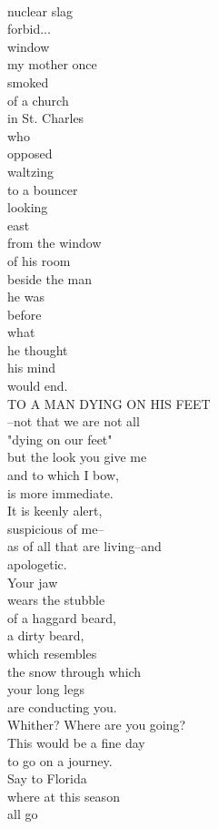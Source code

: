 \documentclass[smalldemyvopaper,11pt,twoside,onecolumn,openright,extrafontsizes]{memoir}
\begin{document}
\\nuclear slag
\\forbid...
\\window
\\my mother once
\\smoked
\\of a church
\\in St. Charles
\\who
\\opposed
\\waltzing
\\to a bouncer
\\looking
\\east
\\from the window
\\of his room
\\beside the man
\\he was
\\before
\\what
\\he thought
\\his mind
\\would end.
\\TO A MAN DYING ON HIS FEET
\\--not that we are not all
\\"dying on our feet"
\\but the look you give me
\\and to which I bow,
\\is more immediate.
\\It is keenly alert,
\\suspicious of me--
\\as of all that are living--and
\\apologetic.
\\Your jaw
\\wears the stubble
\\of a haggard beard,
\\a dirty beard,
\\which resembles
\\the snow through which
\\your long legs
\\are conducting you.
\\Whither? Where are you going?
\\This would be a fine day
\\to go on a journey.
\\Say to Florida
\\where at this season
\\all go
\end{document}
